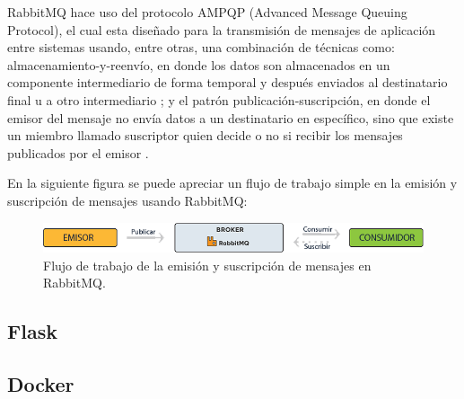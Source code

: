 RabbitMQ hace uso del protocolo AMPQP (Advanced Message Queuing Protocol), el cual esta diseñado para la transmisión
de mensajes de aplicación entre sistemas usando, entre otras, una combinación de técnicas como: almacenamiento-y-reenvío, en donde
los datos son almacenados en un componente intermediario de forma temporal y después enviados al destinatario final u a otro
intermediario \cite{15}; y el patrón publicación-suscripción, en donde el emisor del mensaje no envía datos a un destinatario
en específico, sino que existe un miembro llamado suscriptor quien decide o no si recibir los mensajes publicados por el emisor \cite{16}.

En la siguiente figura se puede apreciar un flujo de trabajo simple en la emisión y suscripción de mensajes usando RabbitMQ:

\begin{figure}[H]
	\centering
		\includegraphics[width=.9\textwidth]{figures/workflow_rabbitmq}
	\caption{Flujo de trabajo de la emisión y suscripción de mensajes en RabbitMQ.}
	\label{fig:workflow_rabbitmq}
\end{figure}

\subsection{Flask}

\subsection{Docker}

